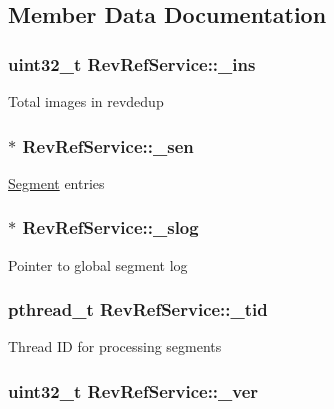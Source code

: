 \subsection{\-Member \-Data \-Documentation}
\hypertarget{structRevRefService_ac5640d7d1bdd4c98d81df91bb5acca1a}{
\subsubsection[{\-\_\-ins}]{\setlength{\rightskip}{0pt plus 5cm}uint32\-\_\-t {\bf \-Rev\-Ref\-Service\-::\-\_\-ins}}}\label{structRevRefService_ac5640d7d1bdd4c98d81df91bb5acca1a}
\-Total images in revdedup \hypertarget{structRevRefService_a2f7fa7cd6def136f29d3b67a2374571c}{
\subsubsection[{\-\_\-sen}]{$\ast$ {\bf \-Rev\-Ref\-Service\-::\-\_\-sen}}}\label{structRevRefService_a2f7fa7cd6def136f29d3b67a2374571c}
\hyperlink{structSegment}{\-Segment} entries \hypertarget{structRevRefService_a80a2769c8d61455fa523cdbfd30632d1}{
\subsubsection[{\-\_\-slog}]{$\ast$ {\bf \-Rev\-Ref\-Service\-::\-\_\-slog}}}\label{structRevRefService_a80a2769c8d61455fa523cdbfd30632d1}
\-Pointer to global segment log \hypertarget{structRevRefService_ae928af1a7099ab639bd37c36d7c2db38}{
\subsubsection[{\-\_\-tid}]{\setlength{\rightskip}{0pt plus 5cm}pthread\-\_\-t {\bf \-Rev\-Ref\-Service\-::\-\_\-tid}}}\label{structRevRefService_ae928af1a7099ab639bd37c36d7c2db38}
\-Thread \-I\-D for processing segments \hypertarget{structRevRefService_a2ce0178a00f065768e68e0e45be7c044}{
\subsubsection[{\-\_\-ver}]{\setlength{\rightskip}{0pt plus 5cm}uint32\-\_\-t {\bf \-Rev\-Ref\-Service\-::\-\_\-ver}}}\label{structRevRefService_a2ce0178a00f065768e68e0e45be7c044}
